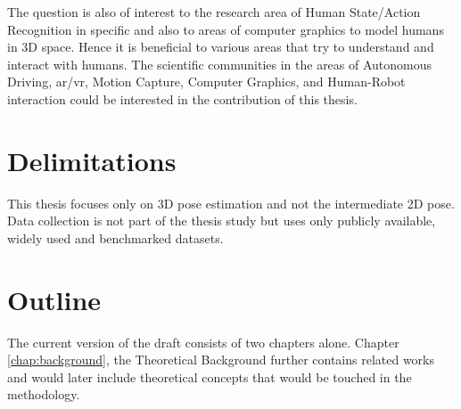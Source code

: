 The question is also of interest to the research area of Human State/Action Recognition in specific and also to areas of computer graphics to model humans in 3D space. Hence it is beneficial to various areas that try to understand and interact with humans. The scientific communities in the areas of Autonomous Driving, \ac{ar/vr}, Motion Capture, Computer Graphics, and Human-Robot interaction could be interested in the contribution of this thesis.

\section{Delimitations}
This thesis focuses only on 3D pose estimation and not the intermediate 2D pose. Data collection is not part of the thesis study but uses only publicly available, widely used and benchmarked datasets. 

\section{Outline}
The current version of the draft consists of two chapters alone. Chapter \ref{chap:background}, the Theoretical Background further contains related works and would later include theoretical concepts that would be touched in the methodology.
